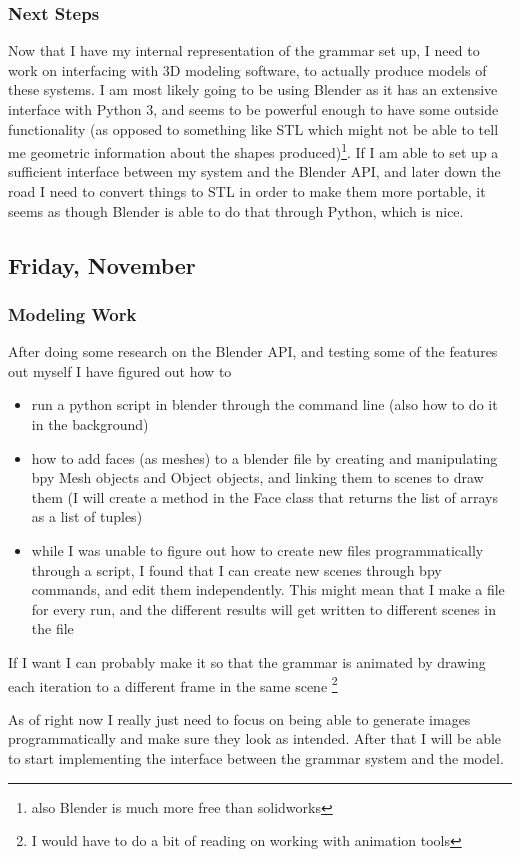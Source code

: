\documentclass[letterpaper,oneside,titlepage]{article}
\begin{document}
\subsubsection{Next Steps}
Now that I have my internal representation of the grammar set up, I need to work on interfacing with 3D modeling software, to actually produce models of these systems.  I am most likely going to be using Blender as it has an extensive interface with Python 3, and seems to be powerful enough to have some outside functionality (as opposed to something like STL which might not be able to tell me geometric information about the shapes produced)\footnote{also Blender is much more free than solidworks}.  If I am able to set up a sufficient interface between my system and the Blender API, and later down the road I need to convert things to STL in order to make them more portable, it seems as though Blender is able to do that through Python, which is nice.


\subsection{Friday, November }

\subsubsection{Modeling Work}
After doing some research on the Blender API, and testing some of the features out myself I have figured out how to
\begin{itemize}
\item run a python script in blender through the command line (also how to do it in the background)
\item how to add faces (as meshes) to a blender file by creating and manipulating bpy Mesh objects and Object objects, and linking them to scenes to draw them (I will create a method in the Face class that returns the list of arrays as a list of tuples)
\item while I was unable to figure out how to create new files programmatically through a script, I found that I can create new scenes through bpy commands, and edit them independently.  This might mean that I make a file for every run, and the different results will get written to different scenes in the file
\end{itemize}

If I want I can probably make it so that the grammar is animated by drawing each iteration to a different frame in the same scene \footnote{I would have to do a bit of reading on working with animation tools}
\par
As of right now I really just need to focus on being able to generate images programmatically and make sure they look as intended.  After that I will be able to start implementing the interface between the grammar system and the model.
\end{document}
